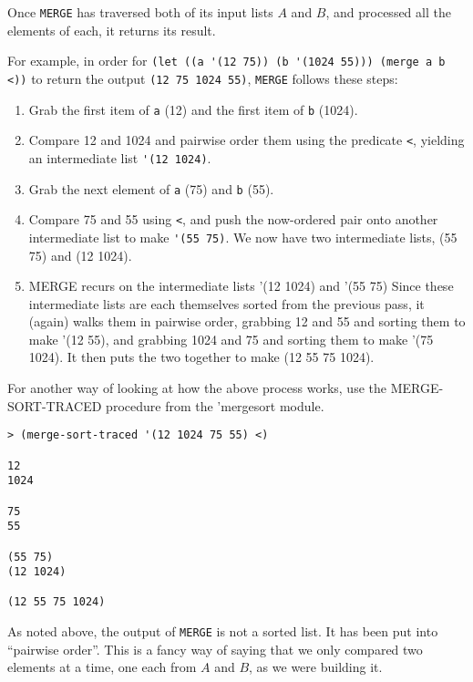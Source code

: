 \documentclass[12pt,openright,draft]{book}
\begin{document}
Once \verb|MERGE| has traversed both of its input lists $A$ and $B$,
and processed all the elements of each, it returns its result.

For example, in order for
\verb|(let ((a '(12 75)) (b '(1024 55))) (merge a b <))| to return the
output \verb|(12 75 1024 55)|, \verb|MERGE| follows these steps:

\begin{enumerate}

\item Grab the first item of \verb|a| (12) and the first item of
  \verb|b| (1024).

\item Compare 12 and 1024 and pairwise order them using the predicate
  \verb|<|, yielding an intermediate list \verb|'(12 1024)|.

\item Grab the next element of \verb|a| (75) and \verb|b| (55).

\item Compare 75 and 55 using \verb|<|, and push the now-ordered pair
  onto another intermediate list to make \verb|'(55 75)|.  We now have
  two intermediate lists, (55 75) and (12 1024).

\item MERGE recurs on the intermediate lists '(12 1024) and '(55 75)
  Since these intermediate lists are each themselves sorted from the
  previous pass, it (again) walks them in pairwise order, grabbing 12
  and 55 and sorting them to make '(12 55), and grabbing 1024 and 75
  and sorting them to make '(75 1024).  It then puts the two together
  to make (12 55 75 1024).
  
\end{enumerate}

For another way of looking at how the above process works, use the
MERGE-SORT-TRACED procedure from the 'mergesort module.

\begin{verbatim}
> (merge-sort-traced '(12 1024 75 55) <)

12
1024

75
55

(55 75)
(12 1024)

(12 55 75 1024)
\end{verbatim}

As noted above, the output of \verb|MERGE| is not a sorted list.  It
has been put into ``pairwise order''.  This is a fancy way of saying
that we only compared two elements at a time, one each from $A$ and
$B$, as we were building it.
\end{document}
